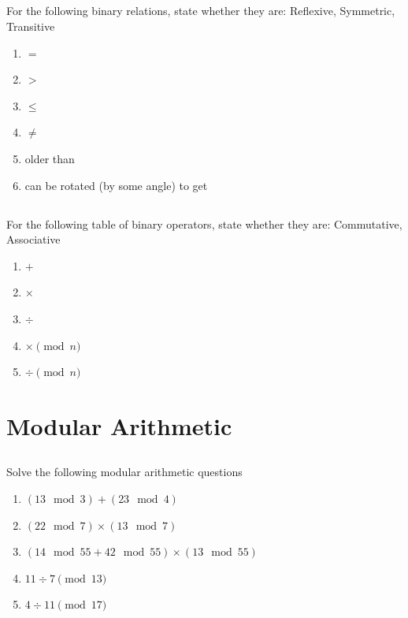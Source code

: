 \documentclass[twocolumn]{article}
\begin{document}
\subsection{}

    For the following binary relations, state whether they are: Reflexive, Symmetric, Transitive

    \begin{enumerate}
        \item $=$
        \item $ > $
        \item $ \leq $
        \item $ \ne $
        \item older than
        \item can be rotated (by some angle) to get
    \end{enumerate}

\subsection{}

    For the following table of binary operators, state whether they are: Commutative, Associative

    \begin{enumerate}
        \item $ + $
        \item $ \times $
        \item $ \div $
        \item $ \times \pmod{n} $
        \item $ \div \pmod{n} $
    \end{enumerate}   


\clearpage
\section{Modular Arithmetic}

\subsection{}

    Solve the following modular arithmetic questions

    \begin{enumerate}
        \item $(13 \mod 3) + (23 \mod 4)$
        \item $(22 \mod 7) \times (13 \mod 7)$
        \item $(14 \mod 55 + 42 \mod 55) \times (13 \mod 55)$
        \item $11 \div 7 \pmod{13}$
        \item $4 \div 11 \pmod{17}$
    \end{enumerate}
\end{document}
